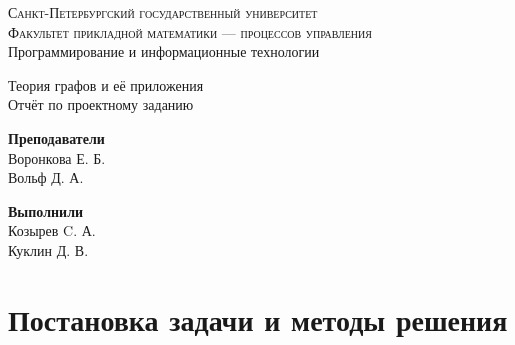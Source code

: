 \documentclass[11pt]{article}
\begin{document}
	
	\begin{titlepage}
	\begin{figure}[t]
	\end{figure}

	\begin{center}
		\textsc{\Large{Санкт-Петербургский государственный университет\\}}
		\textsc{\Large{Факультет прикладной математики --- процессов управления\\}}
		\textnormal{\Large{Программирование и информационные технологии\\}}
		\vspace{24mm}
		
		\Huge{Теория графов и её приложения}\\
		\LARGE{Отчёт по проектному заданию}
	\end{center}
	\vspace{19mm}
		
	\begin{minipage}[t]{0.38\textwidth}
		\textnormal{\large{\textbf{Преподаватели}\\}}
		\large{Воронкова Е. Б.}\\
		\large{Вольф Д. А.}
	\end{minipage}\hfill\begin{minipage}[t]{0.38\textwidth}\raggedleft
		\textnormal{\large{\textbf{Выполнили\\}}}
		\large{Козырев C. А.}\\
		\large{Куклин Д. В.}
	\end{minipage}
	\vspace{19mm}
		
	\pagebreak
    \end{titlepage}
    
    \tableofcontents
    \pagebreak
    
    \section{Постановка задачи и методы решения}
    
\end{document}
